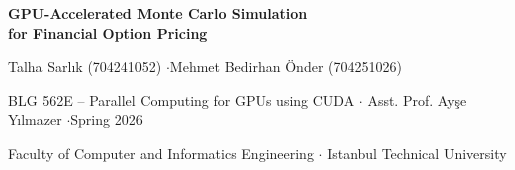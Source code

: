 \documentclass[portrait,a0b,final]{a0poster}
\begin{document}
\pagestyle{empty}

\begin{tcolorbox}[enhanced, colback=ituBlue, colframe=ituBlue,
                  arc=4mm, boxrule=0pt, left=10mm, right=10mm,
                  top=8mm, bottom=6mm]
\centering
\color{white}
{\Huge\bfseries GPU-Accelerated Monte Carlo Simulation\\
for Financial Option Pricing\par}
\vspace{6mm}
{\LARGE Talha Sarlık (704241052) \quad$\cdot$\quad Mehmet Bedirhan Önder (704251026)\par}
\vspace{3mm}
{\large BLG 562E -- Parallel Computing for GPUs using CUDA \quad$\cdot$\quad
Asst. Prof. Ayşe Yılmazer \quad$\cdot$\quad Spring 2026\par}
{\large Faculty of Computer and Informatics Engineering \quad$\cdot$\quad
Istanbul Technical University\par}
\end{tcolorbox}

\vspace{6mm}
\end{document}
